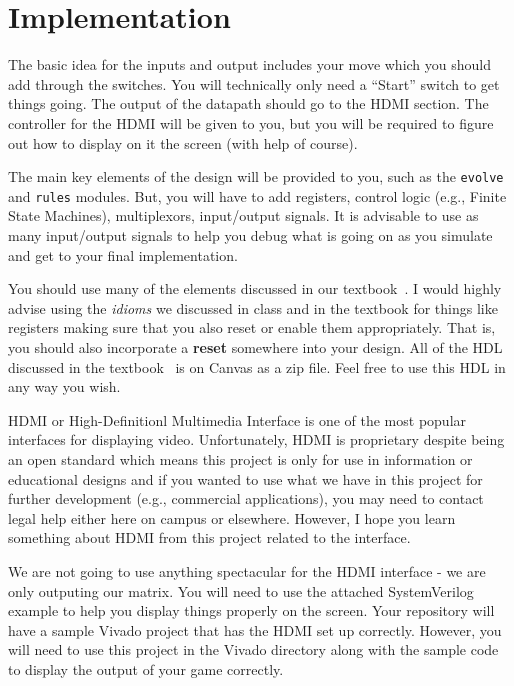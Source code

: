 \documentclass{article}
\begin{document}
\section{Implementation}

The basic idea for the inputs and output includes your move which you
should add through the switches.  You will technically only need a
``Start'' switch to get things going.  The output of the datapath
should go to the HDMI section.  The controller for the HDMI will be
given to you, but you will be required to figure out how to display on
it the screen (with help of course).

The main key elements of the design will be provided to you, such as
the \verb!evolve! and \verb!rules!
modules.  But, you will have to add registers,
control logic (e.g., Finite State Machines), multiplexors, input/output signals.
It is advisable to use as many input/output signals to help you debug
what is going on as you simulate and get to your final
implementation.

You should use many of the elements discussed in our
textbook~\cite{ddca-riscv}.  I would highly advise using the
\textit{idioms} we discussed in class 
and in the textbook for things
like registers making sure that you also reset or enable them appropriately.
That is, you should also incorporate a \textbf{reset} somewhere into your
design.  All of the HDL discussed in the textbook~\cite{ddca-riscv} is
on Canvas as a zip file.  Feel free to use this HDL in any way you wish.

HDMI or High-Definitionl Multimedia Interface is one of the most
popular interfaces for displaying video.  Unfortunately, HDMI is
proprietary despite being an open standard
which means this project is only for use in information or educational
designs and if you wanted to use what we have in this project for
further development (e.g., commercial applications), you may need to
contact legal help either here on campus or elsewhere.  However, I
hope you learn something about HDMI from this project related to the
interface.

We are not going to use anything spectacular for the HDMI interface -
we are only outputing our matrix.  You will need to use the attached
SystemVerilog example to help you display things properly on the
screen.  Your repository will have a sample Vivado project that has
the HDMI set up correctly.  However, you will need to use this project
in the Vivado directory along with the sample code to display the output of your
game correctly.  
\end{document}
